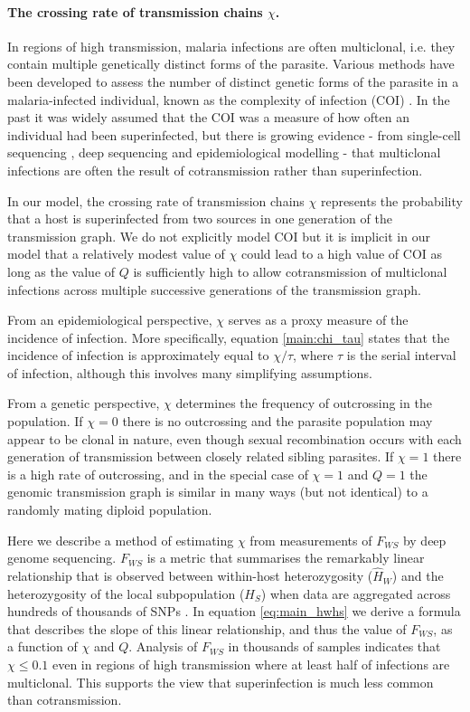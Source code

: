 \documentclass[_main.tex]{subfiles}
\begin{document}
\paragraph{The crossing rate of transmission chains $\chi$.}  In regions of high transmission, malaria infections are often multiclonal, i.e. they contain multiple genetically distinct forms of the parasite.  Various methods have been developed to assess the number of distinct genetic forms of the parasite in a malaria-infected individual, known as the complexity of infection (COI) \cite{Thaithong1984,Viriyakosol1995,Galinsky2015,Chang2017}.  In the past it was widely assumed that the COI was a measure of how often an individual had been superinfected, but there is growing evidence - from single-cell sequencing \cite{Nkhoma2020}, deep sequencing \cite{Zhu2019} and epidemiological modelling \cite{Watson2020} - that multiclonal infections are often the result of cotransmission rather than superinfection.

In our model, the crossing rate of transmission chains $\chi$ represents the probability that a host is superinfected from two sources in one generation of the transmission graph. We do not explicitly model COI but it is implicit in our model that a relatively modest value of $\chi$ could lead to a high value of COI as long as the value of $Q$ is sufficiently high to allow cotransmission of multiclonal infections across multiple successive generations of the transmission graph.

From an epidemiological perspective, $\chi$ serves as a proxy measure of the incidence of infection.  More specifically, equation \ref{main:chi_tau} states that the incidence of infection is approximately equal to $\chi/ \tau$, where $\tau$ is the serial interval of infection, although this involves many simplifying assumptions.  

From a genetic perspective, $\chi$ determines the frequency of outcrossing in the population.  If $\chi = 0$ there is no outcrossing and the parasite population may appear to be clonal in nature, even though sexual recombination occurs with each generation of transmission between closely related sibling parasites.  If $\chi = 1$ there is a high rate of outcrossing, and in the special case of $\chi = 1$ and $Q = 1$ the genomic transmission graph is similar in many ways (but not identical) to a randomly mating diploid population. 

Here we describe a method of estimating $\chi$ from measurements of $F_{WS}$ by deep genome sequencing.  $F_{WS}$ is a metric that summarises the remarkably linear relationship that is observed between within-host heterozygosity ($\widehat{H}_W$) and the heterozygosity of the local subpopulation ($H_S$) when data are aggregated across hundreds of thousands of SNPs \cite{Manske2012}.  In equation \ref{eq:main_hwhs} we derive a formula that describes the slope of this linear relationship, and thus the value of $F_{WS}$, as a function of  $\chi$ and $Q$.  Analysis of $F_{WS}$ in thousands of samples indicates that $\chi \leq 0.1$ even in regions of high transmission where at least half of infections are multiclonal.  This supports the view that superinfection is much less common than cotransmission.
\end{document}

